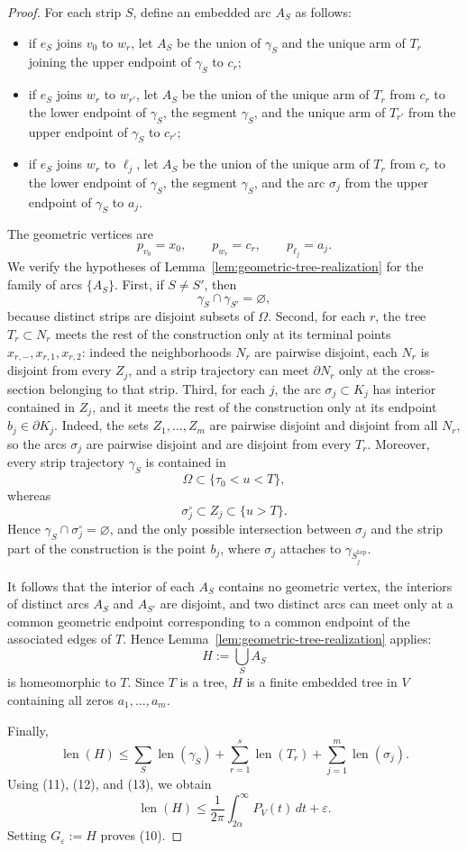 \documentclass[12pt]{amsart}
\theoremstyle{definition}
\theoremstyle{remark}
\begin{document}
\begin{proof}
\indent For each strip $S$, define an embedded arc $A_S$ as follows:
\begin{itemize}
\item if $e_S$ joins $v_0$ to $w_r$, let $A_S$ be the union of $\gamma_S$ and the unique arm of $T_r$ joining the upper
      endpoint of $\gamma_S$ to $c_r$;
\item if $e_S$ joins $w_r$ to $w_{r'}$, let $A_S$ be the union of the unique arm of $T_r$ from $c_r$ to the lower endpoint
      of $\gamma_S$, the segment $\gamma_S$, and the unique arm of $T_{r'}$ from the upper endpoint of $\gamma_S$ to $c_{r'}$;
\item if $e_S$ joins $w_r$ to $\ell_j$, let $A_S$ be the union of the unique arm of $T_r$ from $c_r$ to the lower endpoint
      of $\gamma_S$, the segment $\gamma_S$, and the arc $\sigma_j$ from the upper endpoint of $\gamma_S$ to $a_j$.
\end{itemize}
The geometric vertices are
\[
 p_{v_0}=x_0,\qquad p_{w_r}=c_r,\qquad p_{\ell_j}=a_j.
\]
We verify the hypotheses of Lemma~\ref{lem:geometric-tree-realization} for the family of arcs $\{A_S\}$. First, if $S\neq S'$, then
\[
\gamma_S\cap\gamma_{S'}=\varnothing,
\]
because distinct strips are disjoint subsets of $\Omega$. Second, for each $r$, the tree $T_r\subset N_r$ meets the rest of the construction only at its terminal points $x_{r,-},x_{r,1},x_{r,2}$: indeed the neighborhoods $N_r$ are pairwise disjoint, each $N_r$ is disjoint from every $Z_j$, and a strip trajectory can meet $\partial N_r$ only at the cross-section belonging to that strip. Third, for each $j$, the arc $\sigma_j\subset K_j$ has interior contained in $Z_j$, and it meets the rest of the construction only at its endpoint $b_j\in\partial K_j$. Indeed, the sets $Z_1,\dots,Z_m$ are pairwise disjoint and disjoint from all $N_r$, so the arcs $\sigma_j$ are pairwise disjoint and are disjoint from every $T_r$. Moreover, every strip trajectory $\gamma_S$ is contained in
\[
\Omega\subset\{\tau_0<u<T\},
\]
whereas
\[
\sigma_j^\circ\subset Z_j\subset\{u>T\}.
\]
Hence $\gamma_S\cap \sigma_j^\circ=\varnothing$, and the only possible intersection between $\sigma_j$ and the strip part of the construction is the point $b_j$, where $\sigma_j$ attaches to $\gamma_{S_j^{\mathrm{top}}}$.

It follows that the interior of each $A_S$ contains no geometric vertex, the interiors of distinct arcs $A_S$ and $A_{S'}$ are disjoint, and two distinct arcs can meet only at a common geometric endpoint corresponding to a common endpoint of the associated edges of $T$. Hence Lemma~\ref{lem:geometric-tree-realization} applies:
\[
 H:=\bigcup_S A_S
\]
is homeomorphic to $T$. Since $T$ is a tree, $H$ is a finite embedded tree in $V$ containing all zeros
$a_1,\dots,a_m$.

\indent Finally,
\[
\operatorname{len}(H)\le \sum_S \operatorname{len}(\gamma_S)+\sum_{r=1}^s \operatorname{len}(T_r)+\sum_{j=1}^m \operatorname{len}(\sigma_j).
\]
Using (11), (12), and (13), we obtain
\[
\operatorname{len}(H)\le \frac{1}{2\pi}\int_{2\alpha}^{\infty} P_V(t)\,dt+\varepsilon.
\]
Setting $G_\varepsilon:=H$ proves (10). \end{proof}
\end{document}
